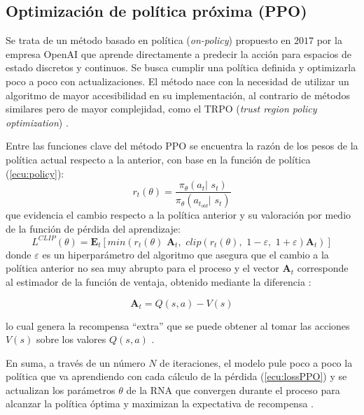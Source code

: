 \subsection{Optimización de política próxima (PPO)}

Se trata de un método basado en política (\textit{on-policy}) propuesto en $2017$ por la empresa OpenAI que aprende directamente a predecir la acción para espacios de estado discretos y continuos. Se busca cumplir una política definida y optimizarla poco a poco con actualizaciones. El método nace con la necesidad de utilizar un algoritmo de mayor accesibilidad en su implementación, al contrario de métodos similares pero de mayor complejidad, como el TRPO (\textit{trust region policy optimization}) \cite{PPObase}. 

Entre las funciones clave del método PPO se encuentra la razón de los pesos de la política actual respecto a la anterior, con base en la función de política (\ref{ecu:policy}):
\begin{equation}
r_t (\theta) = \frac{\pi_\theta (a_t | \,\, s_t)}{\pi_\theta (a_{t_{old}} |\,\, s_t)}
\end{equation}
que evidencia el cambio respecto a la política anterior y su valoración por medio de la función de pérdida del aprendizaje:
\begin{equation}
L^{CLIP} (\theta) = \mathbf{E}_t \left[min (r_t (\theta) \,\, \mathbf{A}_t ,\,\, clip(r_t(\theta),\,\, 1-\varepsilon,\,\, 1+\varepsilon) \mathbf{A}_t)\right]
\label{ecu:lossPPO}
\end{equation}
donde $\varepsilon$ es un hiperparámetro del algoritmo que asegura que el cambio a la política anterior no sea muy abrupto para el proceso y el vector $\mathbf{A}_t$ corresponde al estimador de la función de ventaja, obtenido mediante la diferencia \cite{PPObase}:

\begin{equation}
\mathbf{A}_t = Q(s,a) - V(s)
\end{equation}

lo cual genera la recompensa ``extra'' que se puede obtener al tomar las acciones $V(s)$ sobre los valores $Q(s,a)$ \cite{PPOadv}.

En suma, a través de un número $N$ de iteraciones, el modelo pule poco a poco la política que va aprendiendo con cada cálculo de la pérdida (\ref{ecu:lossPPO}) y se actualizan los parámetros $\theta$ de la RNA que convergen durante el proceso para alcanzar la política óptima y maximizan la expectativa de recompensa \cite{DataScience}.

